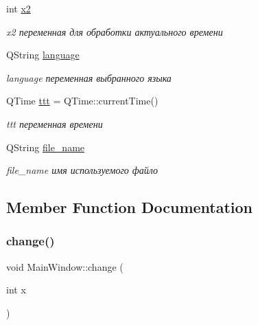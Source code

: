 \begin{DoxyCompactItemize}
\mbox{\label{class_main_window_a7d950218ba060376643b466b5f8752b9}} 
int \mbox{\hyperlink{class_main_window_a7d950218ba060376643b466b5f8752b9}{x2}}
\begin{DoxyCompactList}\small\item\em x2 переменная для обработки актуального времени \end{DoxyCompactList}\item 
\mbox{\label{class_main_window_a696c80d9b945cf72b40dedb8307bc859}} 
Q\+String \mbox{\hyperlink{class_main_window_a696c80d9b945cf72b40dedb8307bc859}{language}}
\begin{DoxyCompactList}\small\item\em language переменная выбранного языка \end{DoxyCompactList}\item 
\mbox{\label{class_main_window_a1d039f71d26a19b1d8c48aa7c776f6eb}} 
Q\+Time \mbox{\hyperlink{class_main_window_a1d039f71d26a19b1d8c48aa7c776f6eb}{ttt}} = Q\+Time\+::current\+Time()
\begin{DoxyCompactList}\small\item\em ttt переменная времени \end{DoxyCompactList}\item 
\mbox{\label{class_main_window_a10b154762b1a2299af68c421041fa19b}} 
Q\+String \mbox{\hyperlink{class_main_window_a10b154762b1a2299af68c421041fa19b}{file\+\_\+name}}
\begin{DoxyCompactList}\small\item\em file\+\_\+name имя используемого файло \end{DoxyCompactList}\end{DoxyCompactItemize}


\subsection{Member Function Documentation}
\mbox{\label{class_main_window_af978c1fc634b73b34ffc2dd64e187c53}} 
\subsubsection{\texorpdfstring{change()}{change()}}
{\footnotesize\ttfamily void Main\+Window\+::change (\begin{DoxyParamCaption}\item[{int}]{x }\end{DoxyParamCaption})}



